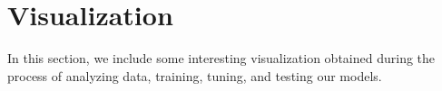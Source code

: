 \section{Visualization}
\newpage
In this section, we include some interesting visualization obtained during the process of analyzing data, training, tuning, and testing our models. 

